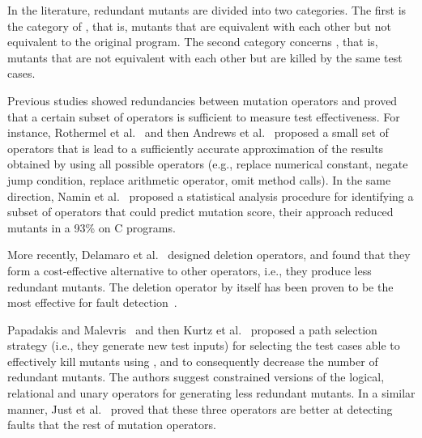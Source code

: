 In the literature, redundant mutants are divided into two categories. The first is the category of , that is, mutants that are equivalent with each other but not equivalent to the original program. The second category concerns , that is, mutants that are not equivalent with each other but are killed by the same test cases. 

Previous studies showed redundancies between mutation operators and proved that a certain subset of operators is sufficient to measure test effectiveness. For instance, Rothermel et al.~\cite{rothermel1996experimental} and then Andrews et al.~\cite{andrews2005mutation} proposed a small set of operators that is lead to a sufficiently accurate approximation of the results obtained by using all possible operators (e.g., replace numerical constant, negate jump condition, replace arithmetic operator, omit method calls). In the same direction, Namin et al.~\cite{siami2008sufficient} proposed a statistical analysis procedure for identifying a subset of operators that could predict mutation score, their approach reduced mutants in a 93\% on C programs. 

More recently, Delamaro et al.~\cite{delamaro2014designing} designed deletion operators, and found that they form a cost-effective alternative to other operators, i.e., they produce less redundant mutants. The deletion operator by itself has been proven to be the most effective for fault detection~\cite{delamaro2014designing}.

Papadakis and Malevris~\cite{papadakis2012mutation} and then Kurtz et al.~\cite{kurtz2015static} proposed a path selection strategy (i.e., they generate new test inputs) for selecting the test cases able to effectively kill mutants using , and to consequently decrease the number of redundant mutants. 
The authors suggest constrained versions of the logical, relational and unary operators for generating less redundant mutants. 
In a similar manner, Just et al.~\cite{just2012redundant,just2015higher} proved that these three operators are better at detecting faults that the rest of mutation operators.

